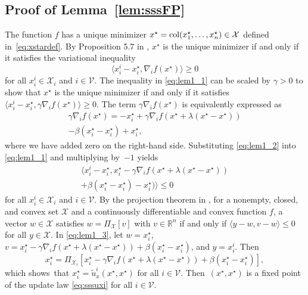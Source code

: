 \documentclass[9pt,shortpaper,twoside,web]{ieeecolor}
\newcommand{\R}{\ensuremath{\mathbb{R}}\xspace}
\newcommand{\X}{\ensuremath{\mathcal{X}}\xspace}
\newcommand{\V}{\ensuremath{\mathcal{V}}\xspace}
\newcommand{\col}[2]{\textnormal{col}(#1,#2)}
\begin{document}
\subsection{Proof of Lemma~\ref{lem:sssFP}} \label{app:lem1proof}
The function $f$ has a unique minimizer $x^\star=\col{x_1^\star,\dots}{x_n^\star}\in\X$ defined in~\eqref{eq:xstardef}.
    By Proposition 5.7 in \cite[Section 3.5.5]{bertsekas1989parallel}, $x^\star$ 
    is the unique minimizer if and only if it 
    satisfies the variational inequality  
    \begin{equation}\label{eq:lem1_1}
        \langle x^i_i-x^\star_i,\nabla_if(x^\star)\rangle\geq 0
    \end{equation}
    for all $x^i_i \in \X_i$ and $i \in \V$.    
    The inequality in \eqref{eq:lem1_1} can be scaled by $\gamma > 0$ to show that 
    $x^{\star}$ is the unique minimizer if and only if it satisfies
    $\langle x^i_i-x^\star_i,\gamma\nabla_if(x^\star)\rangle\geq 0$.
    The term $\gamma\nabla_if(x^\star)$ is equivalently expressed as
    \begin{multline}\label{eq:lem1_2}
        \gamma\nabla_if(x^\star) = -x^\star_i + \gamma \nabla_if(x^\star+\lambda(x^\star-x^\star))\\-\beta(x^\star_i-x^\star_i)+x^\star_i,
    \end{multline}
    where we have added zero on the right-hand side.
    Substituting \eqref{eq:lem1_2} into \eqref{eq:lem1_1} and multiplying by~$-1$ yields
    \begin{multline}\label{eq:lem1_3}
        \langle x^i_i-x^\star_i,x^\star_i-\gamma\nabla_if(x^\star+\lambda(x^\star-x^\star)) \\ +\beta(x^\star_i-x^\star_i)-x^\star_i)\rangle \leq0
    \end{multline}
    for all $x^i_i\in\X_i$ and $i\in\V$.
    By the projection theorem in \cite{bertsekas1989parallel}, for a nonempty, closed, and convex set $\X$ and a continuously differentiable and convex function $f$, a vector $w\in\X$ satisfies $w=\Pi_{\X}[v]$ with $v\in\R^n$ if and only if $\langle y-w,v-w\rangle\leq0$ for all $y\in\X$.
    In \eqref{eq:lem1_3}, let $w=x^\star_i$, $v=x^\star_i-\gamma\nabla_if(x^\star+\lambda(x^\star-x^\star))+\beta(x^\star_i-x^\star_i)$, and $y=x^i_i$.
    Then
    \begin{equation}\label{eq:lem1_4}
        x^\star_i = \Pi_{\X_i}[x^\star_i-\gamma\nabla_i f(x^\star+\lambda(x^\star-x^\star))+\beta(x^\star_i-x^\star_i)],
    \end{equation}
    which shows~that $x^\star_i=\tilde{u}^i_x(x^\star,x^\star)$ for all $i\in\V$.
    Then~$(x^\star,x^\star)$ is a fixed point of the update law \eqref{eq:sssuxi} for all $i\in\V$.
\end{document}
